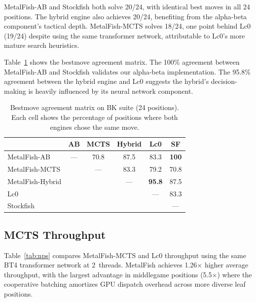 \documentclass{svproc}
\begin{document}
MetalFish-AB and Stockfish both solve 20/24, with identical best moves in all 24 positions. The hybrid engine also achieves 20/24, benefiting from the alpha-beta component's tactical depth. MetalFish-MCTS solves 18/24, one point behind Lc0 (19/24) despite using the same transformer network, attributable to Lc0's more mature search heuristics.

Table~\ref{tab:agreement} shows the bestmove agreement matrix. The 100\% agreement between MetalFish-AB and Stockfish validates our alpha-beta implementation. The 95.8\% agreement between the hybrid engine and Lc0 suggests the hybrid's decision-making is heavily influenced by its neural network component.

\begin{table}[!htbp]
\centering
\caption{Bestmove agreement matrix on BK suite (24 positions). Each cell shows the percentage of positions where both engines chose the same move.}
\label{tab:agreement}
\begin{tabular}{lccccc}
\toprule
& \textbf{AB} & \textbf{MCTS} & \textbf{Hybrid} & \textbf{Lc0} & \textbf{SF} \\
\midrule
MetalFish-AB & --- & 70.8 & 87.5 & 83.3 & \textbf{100} \\
MetalFish-MCTS & & --- & 83.3 & 79.2 & 70.8 \\
MetalFish-Hybrid & & & --- & \textbf{95.8} & 87.5 \\
Lc0 & & & & --- & 83.3 \\
Stockfish & & & & & --- \\
\bottomrule
\end{tabular}
\end{table}

\FloatBarrier
\subsection{MCTS Throughput}
\label{sec:eval-throughput}

Table~\ref{tab:nps} compares MetalFish-MCTS and Lc0 throughput using the same BT4 transformer network at 2~threads. MetalFish achieves 1.26$\times$ higher average throughput, with the largest advantage in middlegame positions (5.5$\times$) where the cooperative batching amortizes GPU dispatch overhead across more diverse leaf positions.
\end{document}
